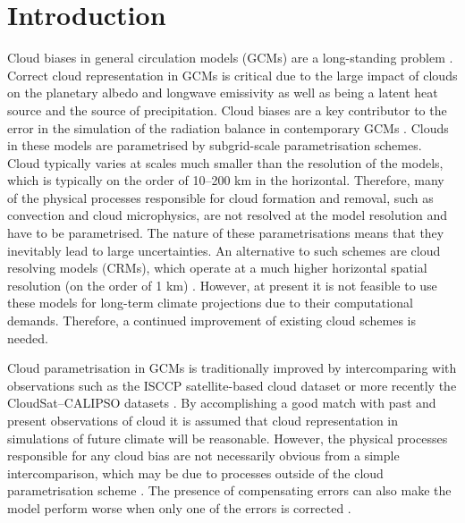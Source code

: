 
\section{Introduction}

Cloud biases in general circulation models (GCMs) are a long-standing problem
\citep{trenberth2010,vignesh2020}. Correct cloud representation in GCMs is critical due
to the large impact of clouds on the planetary albedo and longwave emissivity as well as
being a latent heat source and the source of precipitation. Cloud biases are a key contributor to the error in the
simulation of the radiation balance
in contemporary GCMs \citep{li2013}. Clouds in these models are parametrised by subgrid-scale parametrisation schemes. Cloud typically varies at scales much smaller
than the resolution of the models, which is typically on the order of 10--200 km in the horizontal. Therefore, many of the physical
processes responsible for cloud formation and removal, such as convection and cloud microphysics, are not resolved at the
model resolution and have to be parametrised. The nature of these parametrisations means that they inevitably lead to large uncertainties. An alternative to such schemes are cloud resolving models
(CRMs), which operate at a much higher horizontal spatial resolution (on the order of 1 km)
\citep{guichard2017,satoh2019}.
However, at present it is not feasible to use these models for long-term climate
projections due to their computational demands. Therefore, a continued improvement of
existing cloud schemes is needed.

Cloud parametrisation in GCMs is traditionally improved by intercomparing with
observations such as the ISCCP satellite-based cloud dataset \citep{rossow1991}
or more recently the CloudSat--CALIPSO datasets
\citep{stephens2002,winker2003}. By accomplishing a good match with past and
present observations of cloud it is assumed that cloud representation in
simulations of future climate will be reasonable. However, the physical
processes responsible for any cloud bias are not necessarily obvious from a simple
intercomparison, which may be due to processes outside of the cloud
parametrisation scheme \citep{morcrette2010}. The presence of compensating
errors can also make the model perform worse when only one of the errors is
corrected \citep{hourdin2017,schuddeboom2019}.

